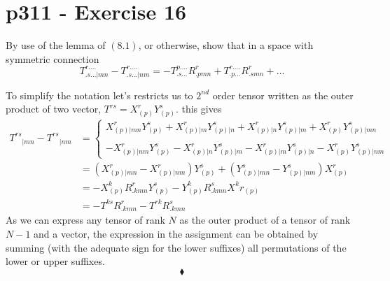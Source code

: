 \section{p311 - Exercise 16}
\begin{tcolorbox}
By use of the lemma of $\mathbf{(8.1)}$, or otherwise, show that in a space with symmetric connection
$$T^{r . \dots}_{.s\dots|mn}-T^{r . \dots}_{.s\dots|nm}= -T^{p . \dots}_{.s\dots}R^r_{.pmn} + T^{r . \dots}_{.p\dots}R^r_{.smn} + \dots$$
\end{tcolorbox}
To simplify the notation let's restricts us to $2^{nd}$ order tensor  written as the outer product of two vector, $T^{rs}= X^r_{(p)}Y^s_{(p)}$. this gives
\begin{align*}
T^{rs}_{\quad|mn}-T^{rs}_{\quad|nm}&= \left\{\begin{matrix}X^r_{(p)|mn}Y^s_{(p)}+X^r_{(p)|m}Y^s_{(p)|n}+X^r_{(p)|n}Y^s_{(p)|m}+X^r_{(p)}Y^s_{(p)|mn}\\\\
-X^r_{(p)|nm}Y^s_{(p)}-X^r_{(p)|n}Y^s_{(p)|m}-X^r_{(p)|m}Y^s_{(p)|n}-X^r_{(p)}Y^s_{(p)|nm}
\end{matrix}\right.\\
&= \left(X^r_{(p)|mn} -X^r_{(p)|nm}\right)Y^s_{(p)}+\left(Y^s_{(p)|mn} -Y^s_{(p)|nm}\right)X^r_{(p)}\\
&= -X^k_{(p)}R^r_{.kmn}Y^s_{(p)}-Y^k_{(p)}R^s_{.kmn}X^kr_{(p)}\\
&= -T^{ks}R^r_{.kmn}-T^{rk}R^s_{.kmn}
\end{align*}
As we can express any tensor of rank $N$ as the outer product of a tensor of rank $N-1$ and a vector, the  expression in the assignment can be obtained by summing (with the adequate sign for the lower suffixes)  all permutations of the lower or upper suffixes.
$$\blacklozenge$$
\newpage



